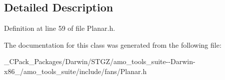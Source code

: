 \subsection{Detailed Description}


Definition at line 59 of file Planar.\+h.



The documentation for this class was generated from the following file\+:\begin{DoxyCompactItemize}
\item 
\+\_\+\+C\+Pack\+\_\+\+Packages/\+Darwin/\+S\+T\+G\+Z/amo\+\_\+tools\+\_\+suite-\/-\/\+Darwin-\/x86\+\_/amo\+\_\+tools\+\_\+suite/include/fans/Planar.\+h\end{DoxyCompactItemize}
